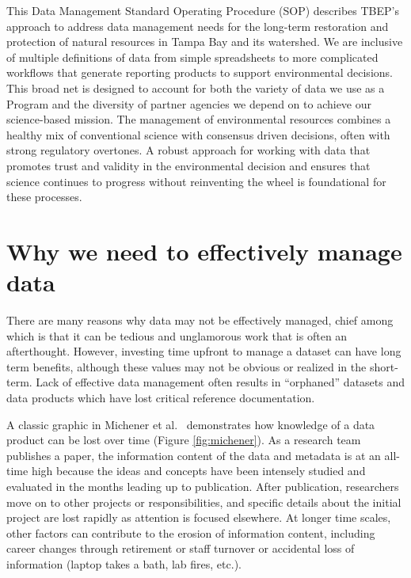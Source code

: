 \documentclass[
]{book}
\begin{document}
This Data Management Standard Operating Procedure (SOP) describes TBEP's approach to address data management needs for the long-term restoration and protection of natural resources in Tampa Bay and its watershed. We are inclusive of multiple definitions of data from simple spreadsheets to more complicated workflows that generate reporting products to support environmental decisions. This broad net is designed to account for both the variety of data we use as a Program and the diversity of partner agencies we depend on to achieve our science-based mission. The management of environmental resources combines a healthy mix of conventional science with consensus driven decisions, often with strong regulatory overtones. A robust approach for working with data that promotes trust and validity in the environmental decision and ensures that science continues to progress without reinventing the wheel is foundational for these processes.

\hypertarget{whymanage}{%
\section{Why we need to effectively manage data}\label{whymanage}}

There are many reasons why data may not be effectively managed, chief among which is that it can be tedious and unglamorous work that is often an afterthought. However, investing time upfront to manage a dataset can have long term benefits, although these values may not be obvious or realized in the short-term. Lack of effective data management often results in ``orphaned'' datasets and data products which have lost critical reference documentation.

A classic graphic in Michener et al.~\citep{Michener97} demonstrates how knowledge of a data product can be lost over time (Figure \ref{fig:michener}). As a research team publishes a paper, the information content of the data and metadata is at an all-time high because the ideas and concepts have been intensely studied and evaluated in the months leading up to publication. After publication, researchers move on to other projects or responsibilities, and specific details about the initial project are lost rapidly as attention is focused elsewhere. At longer time scales, other factors can contribute to the erosion of information content, including career changes through retirement or staff turnover or accidental loss of information (laptop takes a bath, lab fires, etc.).
\end{document}
